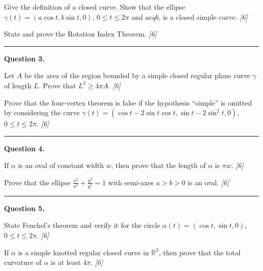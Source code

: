 \documentclass[11pt,a4paper]{article}
\newcommand{\pts}[1]{\hfill   \textit{[#1]}}
\begin{document}
\begin{parts}
  \item Give the definition of a closed curve. Show that the ellipse $\gamma(t) = (a\cos t, b\sin t, 0)$, $0 \le t \le 2\pi$ and $a 
eq b$, is a closed simple curve. \pts{6}
  \item State and prove the Rotation Index Theorem. \pts{6}
\end{parts}

\medskip\rule{\linewidth}{0.2pt}

\medskip


\noindent   \textbf{Question 3.}

\begin{parts}
  \item Let $A$ be the area of the region bounded by a simple closed regular plane curve $\gamma$ of length $L$. Prove that $L^2 \ge 4\pi A$. \pts{6}
  \item Prove that the four-vertex theorem is false if the hypothesis ``simple'' is omitted by considering the curve $\gamma(t) = (\cos t - 2\sin t\cos t, \sin t - 2\sin^2 t, 0)$, $0 \le t \le 2\pi$. \pts{6}
\end{parts}

\medskip\rule{\linewidth}{0.2pt}

\medskip


\noindent   \textbf{Question 4.}

\begin{parts}
  \item If $\alpha$ is an oval of constant width $w$, then prove that the length of $\alpha$ is $\pi w$. \pts{6}
  \item Prove that the ellipse $\frac{x^2}{a^2} + \frac{y^2}{b^2} = 1$ with semi-axes $a > b > 0$ is an oval. \pts{6}
\end{parts}

\medskip\rule{\linewidth}{0.2pt}

\medskip


\noindent   \textbf{Question 5.}

\begin{parts}
  \item State Fenchel's theorem and verify it for the circle $\alpha(t) = (\cos t, \sin t, 0)$, $0 \le t \le 2\pi$. \pts{6}
  \item If $\alpha$ is a simple knotted regular closed curve in $\mathbb{R}^3$, then prove that the total curvature of $\alpha$ is at least $4\pi$. \pts{6}
\end{parts}
\end{document}
